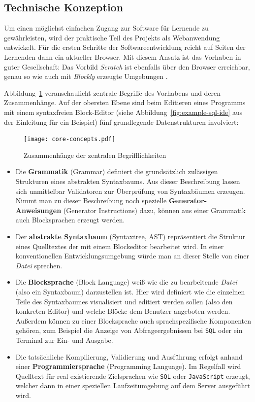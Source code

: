 \documentclass[paper=a4,fontsize=11pt,parskip=half]{scrartcl}
\begin{document}
\subsection{Technische Konzeption}

Um einen möglichst einfachen Zugang zur Software für Lernende zu gewährleisten, wird der praktische Teil des Projekts als Webanwendung entwickelt. Für die ersten Schritte der Softwareentwicklung reicht auf Seiten der Lernenden dann ein aktueller Browser. Mit diesem Ansatz ist das Vorhaben in guter Gesellschaft: Das Vorbild \textit{Scratch} ist ebenfalls über den Browser erreichbar, genau so wie auch mit \textit{Blockly} erzeugte Umgebungen \cite[vgl. S. 28]{riemer_blattwerkzeug_2016}.

Abbildung~\ref{fig:core-relations} veranschaulicht zentrale Begriffe des Vorhabens und deren Zusammenhänge. Auf der obersten Ebene sind beim Editieren eines Programms mit einem syntaxfreien Block-Editor (siehe Abbildung~\ref{fig:example-sql-ide} aus der Einleitung für ein Beispiel) fünf grundlegende Datenstrukturen involviert:

\begin{figure}
  \texttt{[image: core-concepts.pdf]}
  \caption{Zusammenhänge der zentralen Begrifflichkeiten}
  \label{fig:core-relations}
\end{figure}

\begin{itemize}
\item Die \textbf{Grammatik} (Grammar) definiert die grundsätzlich zulässigen Strukturen eines abstrakten Syntaxbaums. Aus dieser Beschreibung lassen sich unmittelbar Validatoren zur Überprüfung von Syntaxbäumen erzeugen. Nimmt man zu dieser Beschreibung noch spezielle \textbf{Generator-Anweisungen} (Generator Instructions) dazu, können aus einer Grammatik auch Blocksprachen erzeugt werden.
\item Der \textbf{abstrakte Syntaxbaum} (Syntaxtree, AST) repräsentiert die Struktur eines Quelltextes der mit einem Blockeditor bearbeitet wird. In einer konventionellen Entwicklungsumgebung würde man an dieser Stelle von einer \textit{Datei} sprechen.
\item Die \textbf{Blocksprache} (Block Language) weiß wie die zu bearbeitende \textit{Datei} (also ein Syntaxbaum) darzustellen ist. Hier wird definiert wie die einzelnen Teile des Syntaxbaumes visualisiert und editiert werden sollen (also den konkreten Editor) und welche Blöcke dem Benutzer angeboten werden. Außerdem können zu einer Blocksprache auch sprachspezifische Komponenten gehören, zum Beispiel die Anzeige von Abfrageergebnissen bei \texttt{SQL} oder ein Terminal zur Ein- und Ausgabe.
\item Die tatsächliche Kompilierung, Validierung und Ausführung erfolgt anhand einer \textbf{Programmiersprache} (Programming Language). Im Regelfall wird Quelltext für real existierende Zielsprachen wie \texttt{SQL} oder \texttt{JavaScript} erzeugt, welcher dann in einer speziellen Laufzeitumgebung auf dem Server ausgeführt wird.
\end{itemize}
\end{document}
